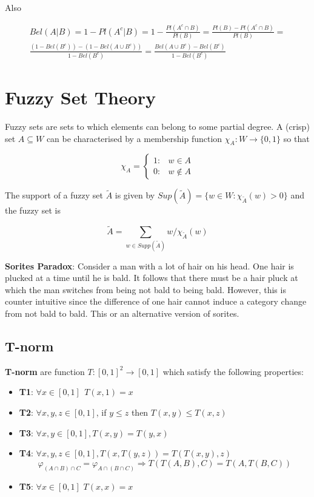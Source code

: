 \documentclass{article}
\begin{document}
Also 

\begin{multline}
    Bel(A | B) = 1 - Pl(A^c | B) = 1 - \frac{Pl(A^c \cap B)}{Pl(B)} = \frac{Pl(B) - Pl(A^c \cap B)}{Pl(B)} = \\ \frac{(1 - Bel(B^c)) - (1 - Bel(A \cup B^c))}{1 - Bel(B^c)} = \frac{Bel(A \cup B^c) - Bel(B^c)}{1 - Bel(B^c)}
\end{multline}



\section{Fuzzy Set Theory}

Fuzzy sets are sets to which elements can belong to some partial degree. A (crisp) set $A \subseteq W$ can be characterised by a membership function $\chi_A: W \rightarrow \{0, 1\}$ so that 

\begin{equation}
    \chi_A = \left\{\begin{matrix} 1: & w \in A \\  0: & w \notin  A \end{matrix}\right.
\end{equation}


The support of a fuzzy set $\tilde{A}$ is given by $Sup(\tilde{A}) = \{ w \in W: \chi_{\tilde{A}}(w)>0 \}$ and the fuzzy set is

\begin{equation}
    \tilde{A} = \sum_{w \in Supp(\tilde{A})} w / \chi_{\tilde{A}} (w)
\end{equation}

\textbf{Sorites Paradox}: Consider a man with a lot of hair on his head. One hair is plucked at a time until he is bald. It follows that there must be a hair pluck at which the man switches from being not bald to being bald. However, this is counter intuitive since the difference of one hair cannot induce a category change from not bald to bald. This or an alternative version of sorites.


\subsection{T-norm}

\textbf{T-norm} are function $T: [0, 1]^2 \rightarrow [0, 1]$ which satisfy the following properties:

\begin{itemize}
    \item \textbf{T1}: $\forall x \in [0, 1]\ \ T(x, 1) = x$
    \item \textbf{T2}: $\forall x, y, z \in [0, 1]$, if $y \leq z$ then $T(x, y) \leq T(x, z)$
    \item \textbf{T3}: $\forall x, y \in [0, 1], T(x, y) = T(y, x)$
    \item \textbf{T4}: $\forall x, y, z \in [0, 1], T(x, T(y, z)) = T(T(x, y), z)$
    $$\varphi_{(A \cap B) \cap C} = \varphi_{A \cap (B \cap C)} \Rightarrow T(T(A, B), C) = T(A, T(B, C))$$
    \item \textbf{T5}: $\forall x \in [0, 1]$ $T(x, x) = x$
\end{itemize}
\end{document}
